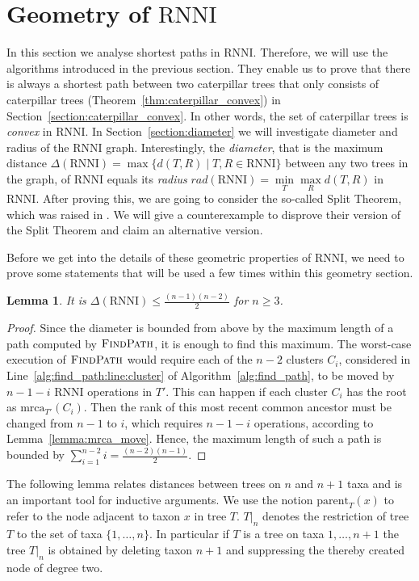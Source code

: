 \documentclass{amsart}
\newcommand{\parent}{\mathrm{parent}}
\newcommand{\mrca}{\mathrm{mrca}}
\newcommand{\rnni}{\mathrm{RNNI}}
\newcommand{\findpath}{\textsc{FindPath}}
\newtheorem{lemma}[definition]{Lemma}
\begin{document}
\section{Geometry of $\rnni$}
\label{section:geometry}

In this section we analyse shortest paths in $\rnni$.
Therefore, we will use the algorithms introduced in the previous section.
They enable us to prove that there is always a shortest path between two caterpillar trees that only consists of caterpillar trees (Theorem~\ref{thm:caterpillar_convex}) in Section~\ref{section:caterpillar_convex}.
In other words, the set of caterpillar trees is \emph{convex} in $\rnni$.
In Section~\ref{section:diameter} we will investigate diameter and radius of the $\rnni$ graph.
Interestingly, the \emph{diameter}, that is the maximum distance $\Delta(\rnni) = \max \{d(T, R) \mid T, R \in \rnni\}$ between any two trees in the graph, of $\rnni$ equals its \emph{radius} $rad(\rnni) = \min\limits_T \max\limits_R d(T,R)$ in $\rnni$.
After proving this, we are going to consider the so-called Split Theorem, which was raised in \autocite{Gavryushkin2018-ol}.
We will give a counterexample to disprove their version of the Split Theorem and claim an alternative version.

Before we get into the details of these geometric properties of $\rnni$, we need to prove some statements that will be used a few times within this geometry section.

\begin{lemma}
It is $\Delta(\rnni) \leq \frac{(n-1)(n-2)}{2}$ for $n \geq 3$.
\label{lemma:diameter_bound}
\end{lemma}

\begin{proof}
Since the diameter is bounded from above by the maximum length of a path computed by $\findpath$, it is enough to find this maximum.
The worst-case execution of $\findpath$ would require each of the $n-2$ clusters $C_i$, considered in Line~\ref{alg:find_path:line:cluster} of Algorithm~\ref{alg:find_path}, to be moved by $n-1-i$ $\rnni$ operations in $T'$.
This can happen if each cluster $C_i$ has the root as $\mrca_{T'}(C_i)$.
Then the rank of this most recent common ancestor must be changed from $n-1$ to $i$, which requires $n-1-i$ operations, according to Lemma~\ref{lemma:mrca_move}.
Hence, the maximum length of such a path is bounded by $\sum\limits_{i = 1}^{n-2} i = \frac{(n-2)(n-1)}{2}$.
\end{proof}

The following lemma relates distances between trees on $n$ and $n+1$ taxa and is an important tool for inductive arguments.
We use the notion $\parent_T(x)$ to refer to the node adjacent to taxon $x$ in tree $T$.
$T{\big|}_n$ denotes the restriction of tree $T$ to the set of taxa $\{1, \ldots, n\}$.
In particular if $T$ is a tree on taxa $1, \ldots, n+1$ the tree $T{\big|}_n$ is obtained by deleting taxon $n+1$ and suppressing the thereby created node of degree two.
\end{document}
